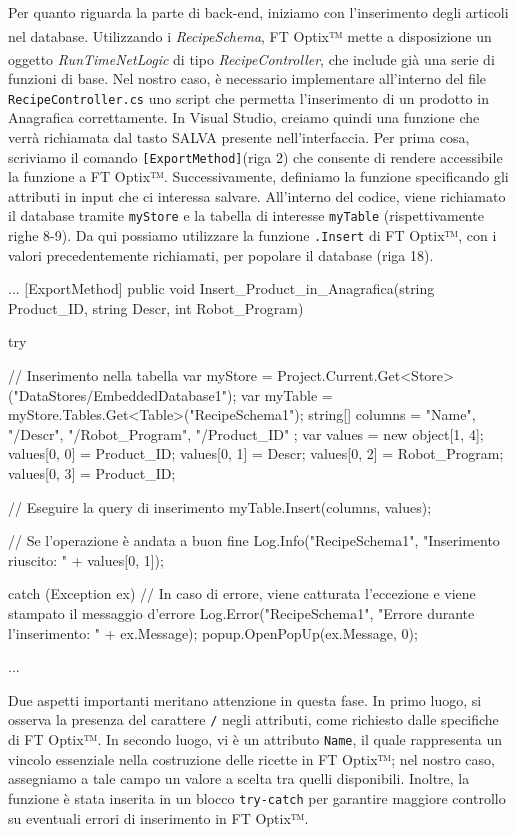 Per quanto riguarda la parte di back-end, iniziamo con l'inserimento degli articoli nel database. Utilizzando i \textit{RecipeSchema}\textsuperscript{\cite{factorytalk_recipes}}, FT Optix™ mette a disposizione un oggetto \textit{RunTimeNetLogic}\textsuperscript{\cite{factorytalk_netlogic}} di tipo \textit{RecipeController}, che include già una serie di funzioni di base. Nel nostro caso, è necessario implementare all'interno del file \verb|RecipeController.cs| uno script che permetta l'inserimento di un prodotto in Anagrafica correttamente. In Visual Studio, creiamo quindi una funzione che verrà richiamata dal tasto SALVA presente nell'interfaccia. Per prima cosa, scriviamo il comando \verb|[ExportMethod]|(riga 2) che consente di rendere accessibile la funzione a FT Optix™. Successivamente, definiamo la funzione specificando gli attributi in input che ci interessa salvare. All'interno del codice, viene richiamato il database tramite \verb|myStore| e la tabella di interesse \verb|myTable| (rispettivamente righe 8-9). Da qui possiamo utilizzare la funzione \verb|.Insert| di FT Optix™, con i valori precedentemente richiamati, per popolare il database (riga 18).
\begin{csharp}
...
    [ExportMethod]
    public void Insert_Product_in_Anagrafica(string Product_ID, string Descr, int Robot_Program)
    {
        try
        {
            // Inserimento nella tabella
            var myStore = Project.Current.Get<Store>("DataStores/EmbeddedDatabase1");
            var myTable = myStore.Tables.Get<Table>("RecipeSchema1");
            string[] columns = { "Name", "/Descr", "/Robot_Program", "/Product_ID" };
            var values = new object[1, 4];
            values[0, 0] = Product_ID;
            values[0, 1] = Descr;
            values[0, 2] = Robot_Program;
            values[0, 3] = Product_ID;
    
            // Eseguire la query di inserimento
            myTable.Insert(columns, values);
    
            // Se l'operazione è andata a buon fine
            Log.Info("RecipeSchema1", "Inserimento riuscito: " + values[0, 1]);
        }
        catch (Exception ex)
        {
            // In caso di errore, viene catturata l'eccezione e viene stampato il messaggio d'errore
            Log.Error("RecipeSchema1", "Errore durante l'inserimento: " + ex.Message);
            popup.OpenPopUp(ex.Message, 0);
        }
    }
...
\end{csharp}
Due aspetti importanti meritano attenzione in questa fase. In primo luogo, si osserva la presenza del carattere \verb|/| negli attributi, come richiesto dalle specifiche di FT Optix™. In secondo luogo, vi è un attributo \verb|Name|, il quale rappresenta un vincolo essenziale nella costruzione delle ricette in FT Optix™; nel nostro caso, assegniamo a tale campo un valore a scelta tra quelli disponibili. Inoltre, la funzione è stata inserita in un blocco \verb|try-catch| per garantire maggiore controllo su eventuali errori di inserimento in FT Optix™.
